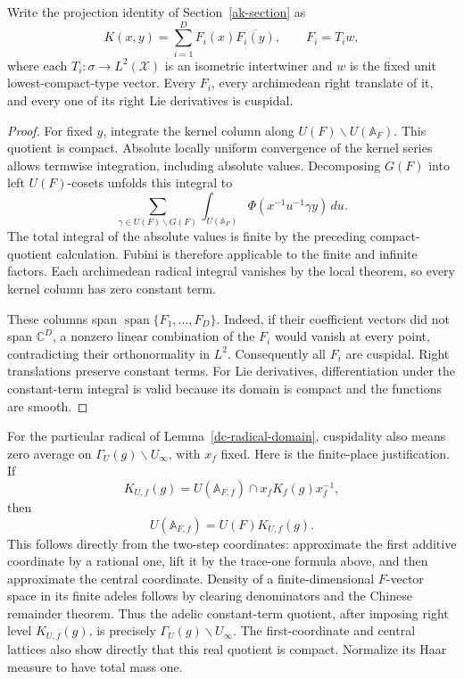 \begin{lemma}\label{dc-cuspidal}
Write the projection identity of Section~\ref{ak-section}
as
\[
 K(x,y)=\sum_{i=1}^D F_i(x)\overline{F_i(y)},\qquad
 F_i=T_iw,
\]
where each \(T_i:\sigma\to L^2(\mathcal X)\) is an
isometric intertwiner and \(w\) is the fixed unit
lowest-compact-type vector.  Every \(F_i\), every
archimedean right translate of it, and every one of
its right Lie derivatives is cuspidal.
\end{lemma}
\begin{proof}
For fixed \(y\), integrate the kernel column along
\(U(F)\backslash U(\mathbb A_F)\).
This quotient is compact.  Absolute locally uniform
convergence of the kernel series allows termwise
integration, including absolute values.  Decomposing
\(G(F)\) into left \(U(F)\)-cosets unfolds this integral
to
\[
 \sum_{\gamma\in U(F)\backslash G(F)}
       \int_{U(\mathbb A_F)}
                   \Phi(x^{-1}u^{-1}\gamma y)\,du .
\]
The total integral of the absolute values is finite
by the preceding compact-quotient calculation.
Fubini is therefore applicable to the finite and
infinite factors.  Each archimedean radical integral
vanishes by the local theorem, so every kernel
column has zero constant term.

These columns span \(\operatorname{span}\{F_1,\ldots,F_D\}\).
Indeed, if their coefficient vectors did not span
\(\mathbb C^D\), a nonzero linear combination of the
\(F_i\) would vanish at every point, contradicting
their orthonormality in \(L^2\).
Consequently all \(F_i\) are cuspidal.
Right translations preserve constant terms.
For Lie derivatives, differentiation under the
constant-term integral is valid because its domain
is compact and the functions are smooth.
\end{proof}

For the particular radical of Lemma~\ref{dc-radical-domain},
cuspidality also means zero average on
\(\Gamma_U(g)\backslash U_\infty\), with \(x_f\) fixed.
Here is the finite-place justification.
If
\[
 K_{U,f}(g)=U(\mathbb A_{F,f})\cap x_fK_f(g)x_f^{-1},
\]
then
\[
                 U(\mathbb A_{F,f})=U(F)K_{U,f}(g).
\]
This follows directly from the two-step coordinates:
approximate the first additive coordinate by a rational
one, lift it by the trace-one formula above, and then
approximate the central coordinate.  Density of a
finite-dimensional \(F\)-vector space in its finite
adeles follows by clearing denominators and the
Chinese remainder theorem.  Thus the adelic
constant-term quotient, after imposing right level
\(K_{U,f}(g)\), is precisely
\(\Gamma_U(g)\backslash U_\infty\).
The first-coordinate and central lattices also show
directly that this real quotient is compact.
Normalize its Haar measure to have total mass one.

